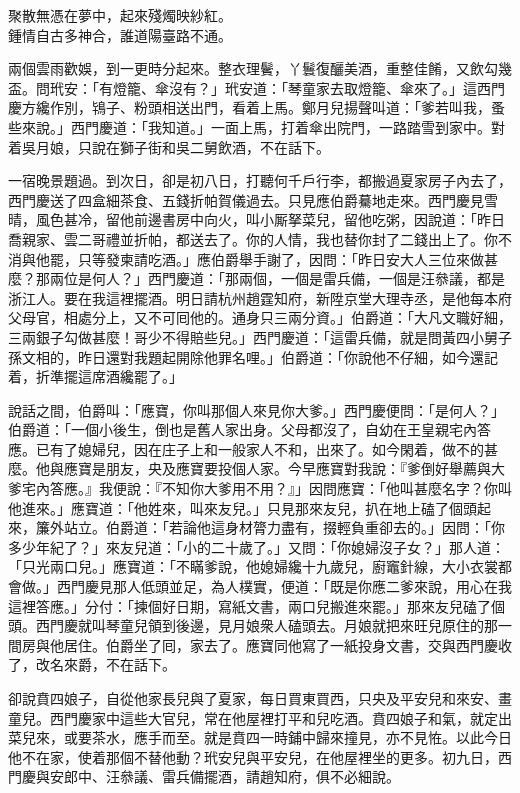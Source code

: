 \begin{myquote} 
聚散無憑在夢中，起來殘燭映紗紅。\\鍾情自古多神合，誰道陽臺路不通。
\end{myquote} 

兩個雲雨歡娛，到一更時分起來。整衣理鬢，丫鬟復釃美酒，重整佳餚，又飲勾幾盃。問玳安：「有燈籠、傘沒有？」玳安道：「琴童家去取燈籠、傘來了。」這西門慶方纔作別，鴇子、粉頭相送出門，看着上馬。鄭月兒揚聲叫道：「爹若叫我，蚤些來說。」西門慶道：「我知道。」一面上馬，打着傘出院門，一路踏雪到家中。對着吳月娘，只說在獅子街和吳二舅飲酒，不在話下。

一宿晚景題過。到次日，卻是初八日，打聽何千戶行李，都搬過夏家房子內去了，西門慶送了四盒細茶食、五錢折帕賀儀過去。只見應伯爵驀地走來。西門慶見雪晴，風色甚冷，留他前邊書房中向火，叫小厮拏菜兒，留他吃粥，因說道：「昨日喬親家、雲二哥禮並折帕，都送去了。你的人情，我也替你封了二錢出上了。你不消與他罷，只等發柬請吃酒。」應伯爵舉手謝了，因問：「昨日安大人三位來做甚麼？那兩位是何人？」西門慶道：「那兩個，一個是雷兵備，一個是汪叅議，都是浙江人。要在我這裡擺酒。明日請杭州趙霆知府，新陞京堂大理寺丞，是他每本府父母官，相處分上，又不可囘他的。通身只三兩分資。」伯爵道：「大凡文職好細，三兩銀子勾做甚麼！哥少不得賠些兒。」西門慶道：「這雷兵備，就是問黃四小舅子孫文相的，昨日還對我題起開除他罪名哩。」伯爵道：「你說他不仔細，如今還記着，折準擺這席酒纔罷了。」{}

說話之間，伯爵叫：「應寶，你叫那個人來見你大爹。」西門慶便問：「是何人？」伯爵道：「一個小後生，倒也是舊人家出身。父母都沒了，自幼在王皇親宅內答應。已有了媳婦兒，因在庄子上和一般家人不和，出來了。如今閑着，做不的甚麼。他與應寶是朋友，央及應寶要投個人家。今早應寶對我說：『爹倒好舉薦與大爹宅內答應。』我便說：『不知你大爹用不用？』」因問應寶：「他叫甚麼名字？你叫他進來。」應寶道：「他姓來，叫來友兒。」只見那來友兒，扒在地上磕了個頭起來，簾外站立。伯爵道：「若論他這身材膂力盡有，掇輕負重卻去的。」因問：「你多少年紀了？」來友兒道：「小的二十歲了。」又問：「你媳婦沒子女？」那人道：「只光兩口兒。」應寶道：「不瞞爹說，他媳婦纔十九歲兒，廚竈針線，大小衣裳都會做。」西門慶見那人低頭並足，為人樸實，便道：「既是你應二爹來說，用心在我這裡答應。」分付：「揀個好日期，寫紙文書，兩口兒搬進來罷。」那來友兒磕了個頭。西門慶就叫琴童兒領到後邊，見月娘衆人磕頭去。月娘就把來旺兒原住的那一間房與他居住。伯爵坐了囘，家去了。應寶同他寫了一紙投身文書，交與西門慶收了，改名來爵，不在話下。

卻說賁四娘子，自從他家長兒與了夏家，每日買東買西，只央及平安兒和來安、畫童兒。西門慶家中這些大官兒，常在他屋裡打平和兒吃酒。賁四娘子和氣，就定出菜兒來，或要茶水，應手而至。就是賁四一時鋪中歸來撞見，亦不見恠。以此今日他不在家，使着那個不替他動？玳安兒與平安兒，在他屋裡坐的更多。初九日，西門慶與安郎中、汪叅議、雷兵備擺酒，請趙知府，俱不必細說。

